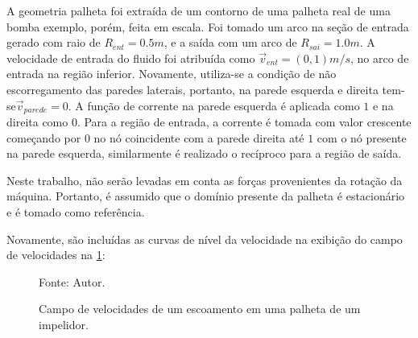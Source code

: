 A geometria palheta foi extraída de um contorno de uma palheta real de uma bomba exemplo, porém, feita em escala.
Foi tomado um arco na seção de entrada gerado com raio de $R_{ent}=0.5m$, e a saída com um arco de $R_{sai}=1.0m$.
A velocidade de entrada do fluido foi atribuída como $\vec{v}_{ent}=(0, 1)m/s$, no arco de entrada na região inferior.
Novamente, utiliza-se a condição de não escorregamento das paredes laterais, portanto, na parede esquerda e direita tem-se$\vec{v}_{parede}=0$.
A função de corrente na parede esquerda é aplicada como $1$ e na direita como $0$.
Para a região de entrada, a corrente é tomada com valor crescente começando por $0$ no nó coincidente com a parede direita até $1$ com o nó presente na parede esquerda, similarmente é realizado o recíproco para a região de saída.

Neste trabalho, não serão levadas em conta as forças provenientes da rotação da máquina.
Portanto, é assumido que o domínio presente da palheta é estacionário e é tomado como referência.

Novamente, são incluídas as curvas de nível da velocidade na exibição do campo de velocidades na \ref{rotor_result}:
\begin{figure}[H]
    \centering
     {\raggedleft \scriptsize Fonte: Autor.}
    \caption{Campo de velocidades de um escoamento em uma palheta de um impelidor.}
    \label{rotor_result}
\end{figure}

